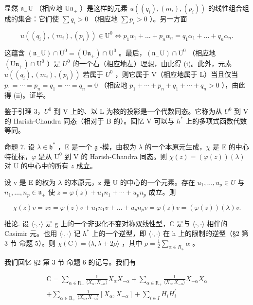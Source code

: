 显然 \(\mathfrak{n}_{-}\mathrm{U}\) （相应地 \(\mathrm{U}\mathfrak{n}_{+}\) ）是这样的元素 \(u((q_{i}),(m_{i}),(p_{i}))\) 的线性组合组成的集合：它们使 \(\sum q_{i}>0\) （相应地 \(\sum p_{i}>0\) ）。另一方面

\[
u \left(\left(q _ {i}\right), \left(m _ {i}\right), \left(p _ {i}\right)\right) \in \mathrm{U} ^ {0} \Longleftrightarrow p _ {1} \alpha_ {1} + \dots + p _ {n} \alpha_ {n} = q _ {1} \alpha_ {1} + \dots + q _ {n} \alpha_ {n}.
\]

这蕴含 \((\mathfrak{n}_{-}\mathrm{U})\cap\mathrm{U}^{0}=(\mathrm{U}\mathfrak{n}_{+})\cap\mathrm{U}^{0}\) 。最后，\((\mathfrak{n}_{-}\mathrm{U})\cap\mathrm{U}^{0}\) （相应地 \((\mathrm{U}\mathfrak{n}_{+})\cap\mathrm{U}^{0}\) ）是 \(U^{0}\) 的一个右（相应地左）理想，由此得 (i)。此外，元素 \(u((q_{i}),(m_{i}),(p_{i}))\) 若属于 \(U^{0}\) ，则它属于 V（相应地属于 L）当且仅当 \(p_{1}=\cdots=p_{n}=q_{1}=\cdots=q_{n}=0\) （相应地 \(p_{1}+\cdots+p_{n}+q_{1}+\cdots+q_{n}>0\) ），由此得 (ii)。证毕。

鉴于引理 3，\(U^{0}\) 到 V 上的、以 L 为核的投影是一个代数同态。它称为从 \(U^{0}\) 到 V 的 Harish-Chandra 同态（相对于 B 的）。回忆 V 可以与 \(h^{*}\) 上的多项式函数代数等同。

命题 7. 设 \(\lambda \in \mathfrak{h}^*\) ，E 是一个 \(\mathfrak{g}\) -模，由权为 \(\lambda\) 的一个本原元生成，\(\chi\) 是 E 的中心特征标，\(\varphi\) 是从 \(\mathrm{U}^0\) 到 V 的 Harish-Chandra 同态。则 \(\chi(z) = (\varphi(z))(\lambda)\) 对 U 的中心中的所有 \(z\) 成立。

设 v 是 E 的权为 \(\lambda\) 的本原元，z 是 U 的中心的一个元素。存在 \(u_{1},\ldots,u_{p}\in U\) 与 \(n_{1},\ldots,n_{p}\in\mathfrak{n}_{+}\) 使 \(z=\varphi(z)+u_{1}n_{1}+\cdots+u_{p}n_{p}\) 成立。则

\[
\chi (z) v = z v = \varphi (z) v + u _ {1} n _ {1} v + \dots + u _ {p} n _ {p} v = \varphi (z) v = (\varphi (z)) (\lambda) v.
\]

推论. 设 \(\langle\cdot,\cdot\rangle\) 是 g 上的一个非退化不变对称双线性型，C 是与 \(\langle\cdot,\cdot\rangle\) 相伴的 Casimir 元。也用 \(\langle\cdot,\cdot\rangle\) 记 \(h^{*}\) 上的一个逆型，即 \(\langle\cdot,\cdot\rangle\) 在 h 上的限制的逆型（§2 第 3 节 命题 5）。则 \(\chi(\mathrm{C})=\langle\lambda,\lambda+2\rho\rangle\) ，其中 \(\rho=\frac{1}{2}\sum_{\alpha\in R_{+}}\alpha\) 。

我们回忆 §2 第 3 节 命题 6 的记号。我们有

\[
\begin{array}{r} \mathrm{C} = \sum_ {\alpha \in \mathrm{R} _ {-}} \frac {1}{\langle X _ {\alpha} , X _ {- \alpha} \rangle} X _ {\alpha} X _ {- \alpha} + \sum_ {\alpha \in \mathrm{R} _ {+}} \frac {1}{\langle X _ {\alpha} , X _ {- \alpha} \rangle} X _ {- \alpha} X _ {\alpha} \\ + \sum_ {\alpha \in \mathrm{R} _ {+}} \frac {1}{\langle X _ {\alpha} , X _ {- \alpha} \rangle} [ X _ {\alpha}, X _ {- \alpha} ] + \sum_ {i \in I} H _ {i} H _ {i} ^ {\prime} \end{array}
\]

